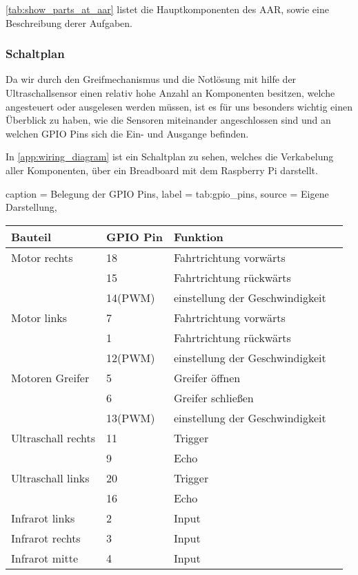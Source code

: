 \autoref{tab:show_parts_at_aar} listet die Hauptkomponenten des \ac{AAR}, sowie eine Beschreibung derer Aufgaben.

\subsubsection{Schaltplan}
Da wir durch den Greifmechanismus und die Notlösung mit hilfe der Ultraschallsensor einen relativ hohe Anzahl an Komponenten besitzen, welche angesteuert oder ausgelesen werden müssen, ist es für uns besonders wichtig einen Überblick zu haben, wie die Sensoren miteinander angeschlossen sind und an welchen GPIO Pins sich die Ein- und Ausgange befinden.

In \autoref{app:wiring_diagram} ist ein Schaltplan zu sehen, welches die Verkabelung aller Komponenten, über ein Breadboard mit dem Raspberry Pi darstellt.

\begin{dhbwtable}{%
    caption	= Belegung der GPIO Pins,
    label	= tab:gpio_pins,
    source	= Eigene Darstellung,
}
    \begin{tabular}{llll}
        \toprule
        \textbf{Bauteil}    & \textbf{GPIO Pin}     &\textbf{Funktion}   \\\midrule
        Motor rechts   	    & 18                    & Fahrtrichtung vorwärts\\
                            & 15                    & Fahrtrichtung rückwärts \\
                            & 14(PWM)               & einstellung der Geschwindigkeit\\
        Motor links   	    & 7                     & Fahrtrichtung vorwärts\\
                            & 1                     & Fahrtrichtung rückwärts \\
                            & 12(PWM)               & einstellung der Geschwindigkeit\\    
        Motoren Greifer   	& 5                     & Greifer öffnen\\
                            & 6                     & Greifer schließen \\
                            & 13(PWM)               & einstellung der Geschwindigkeit\\
        Ultraschall rechts 	& 11                    & Trigger\\
                            & 9                     & Echo \\
        Ultraschall links   & 20                    & Trigger\\
                            & 16                    & Echo \\ 
        Infrarot links      & 2                     & Input\\
        Infrarot rechts     & 3                     & Input\\
        Infrarot mitte      & 4                     & Input\\        
   \bottomrule
    \end{tabular}    
\end{dhbwtable}


